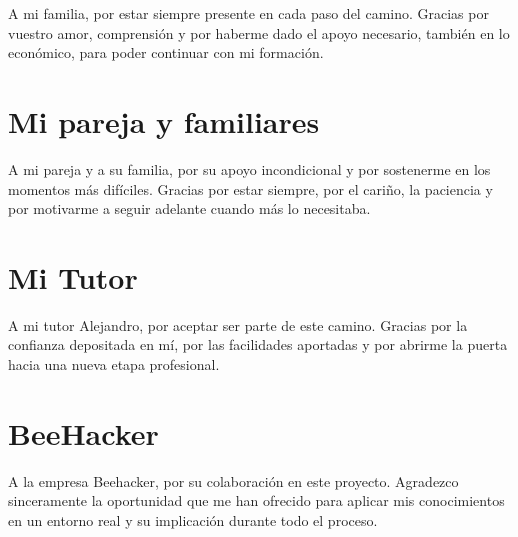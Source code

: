 \documentclass[a4paper, 11pt]{article}
\begin{document}
\vfill
\begin{flushright}
\begin{minipage}{0.5\textwidth}
A mi familia, por estar siempre presente en cada paso del camino. Gracias por vuestro amor, comprensión y por haberme dado el apoyo necesario, también en lo económico, para poder continuar con mi formación.
\end{minipage}
\end{flushright}
\clearpage
\thispagestyle{nohead}

\section*{Mi pareja y familiares}

\vfill
\begin{flushright}
\begin{minipage}{0.5\textwidth}
A mi pareja y a su familia, por su apoyo incondicional y por sostenerme en los momentos más difíciles. Gracias por estar siempre, por el cariño, la paciencia y por motivarme a seguir adelante cuando más lo necesitaba.
\end{minipage}
\end{flushright}
\clearpage
\thispagestyle{nohead}

\section*{Mi Tutor}

\vfill
\begin{flushright}
\begin{minipage}{0.5\textwidth}
A mi tutor Alejandro, por aceptar ser parte de este camino. Gracias por la confianza depositada en mí, por las facilidades aportadas y por abrirme la puerta hacia una nueva etapa profesional.
\end{minipage}
\end{flushright}
\clearpage
\thispagestyle{nohead}

\section*{BeeHacker}
\vfill
\begin{flushright}
\begin{minipage}{0.5\textwidth}
A la empresa Beehacker, por su colaboración en este proyecto. Agradezco sinceramente la oportunidad que me han ofrecido para aplicar mis conocimientos en un entorno real y su implicación durante todo el proceso.
\end{minipage}
\end{flushright}
\clearpage
\end{document}
